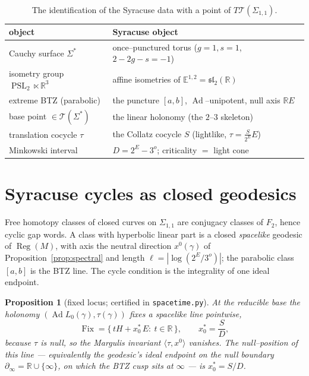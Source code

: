 \documentclass[11pt,a4paper]{article}
\theoremstyle{bourbaki}
\newtheorem{prop}[thm]{Proposition}
\theoremstyle{bourbakidef}
\newcommand{\R}{\mathbb{R}}
\newcommand{\Emink}{\mathbb{E}^{1,2}}
\newcommand{\slt}{\mathfrak{sl}_2(\R)}
\newcommand{\Teich}{\mathcal{T}}
\DeclareMathOperator{\Ad}{Ad}
\DeclareMathOperator{\PSL}{PSL}
\DeclareMathOperator{\Fix}{Fix}
\DeclareMathOperator{\Reg}{Reg}
\begin{document}
\begin{table}[ht]
  \centering
  \begin{tabular}{@{}ll@{}}
    \toprule
    \textbf{\cite{Brunswic2021} object} & \textbf{Syracuse object}\\
    \midrule
    Cauchy surface $\Sigma^\ast$            & once--punctured torus ($g{=}1,s{=}1$, $2{-}2g{-}s{=}{-}1$)\\
    isometry group $\PSL_2\ltimes\R^3$      & affine isometries of $\Emink=\slt$\\
    extreme BTZ (parabolic)                 & the puncture $[a,b]$, $\Ad$--unipotent, null axis $\R E$\\
    base point $\in\Teich(\Sigma^\ast)$     & the linear holonomy (the $2$--$3$ skeleton)\\
    translation cocycle $\tau$              & the Collatz cocycle $S$ (lightlike, $\tau=\tfrac{S}{2^E}E$)\\
    Minkowski interval                      & $D=2^E-3^o$; criticality $=$ light cone\\
    \bottomrule
  \end{tabular}
  \caption{The identification of the Syracuse data with a point of $T\Teich(\Sigma_{1,1})$.}
  \label{tab:dict}
\end{table}

\section{Syracuse cycles as closed geodesics}\label{sec:main}

Free homotopy classes of closed curves on $\Sigma_{1,1}$ are conjugacy classes of $F_2$,
hence cyclic gap words. A class with hyperbolic linear part is a closed \emph{spacelike}
geodesic of $\Reg(M)$, with axis the neutral direction $x^0(\gamma)$ of
Proposition~\ref{prop:spectral} and length $\ell=|\log(2^E/3^o)|$; the parabolic class
$[a,b]$ is the BTZ line. The cycle condition is the integrality of one ideal endpoint.

\begin{prop}[fixed locus; certified in \texttt{spacetime.py}]\label{prop:fix}
At the reducible base the holonomy $(\Ad L_0(\gamma),\tau(\gamma))$ fixes a spacelike line
pointwise,
\[
  \Fix=\bigl\{\,tH+x_0^\ast\,E:\ t\in\R\,\bigr\},\qquad x_0^\ast=\frac{S}{D},
\]
because $\tau$ is null, so the Margulis invariant $\langle\tau,x^0\rangle$ vanishes. The
null--position of this line --- equivalently the geodesic's ideal endpoint on the null
boundary $\partial_\infty=\R\cup\{\infty\}$, on which the BTZ cusp sits at $\infty$ --- is
$x_0^\ast=S/D$.
\end{prop}
\end{document}
